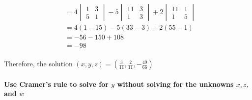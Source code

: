 \documentclass[
  letterpaper,
  DIV=11,
  numbers=noendperiod]{scrartcl}
\let\oldparagraph\paragraph
\renewcommand{\paragraph}[1]{\oldparagraph{#1}\mbox{}}
\begin{document}
\begin{align*}
&= 4\begin{vmatrix}1 & 3 \\ 5 & 1\end{vmatrix}-5\begin{vmatrix}11 & 3 \\ 1 & 3\end{vmatrix}+2\begin{vmatrix}11 & 1 \\ 1 & 5\end{vmatrix} \\
&= 4(1-15)-5(33-3)+2(55-1) \\
&= -56-150+108 \\
&= -98 \\
\end{align*}

Therefore, the solution
\((x, y, z) = (\frac{3}{11}, \frac{2}{11}, -\frac{49}{66})\)

\newpage{}

\paragraph{\texorpdfstring{Use Cramer's rule to solve for \(y\) without
solving for the unknowns \(x, z,\) and
\(w\)}{Use Cramer's rule to solve for y without solving for the unknowns x, z, and w}}\label{use-cramers-rule-to-solve-for-y-without-solving-for-the-unknowns-x-z-and-w}

\end{document}
